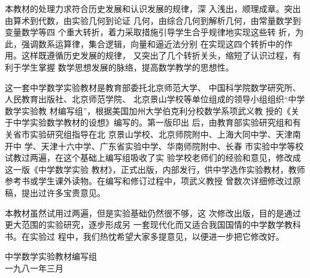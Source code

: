    本教材的处理力求符合历史发展和认识发展的规律，深
入浅出，顺理成章。突出由算术到代数，由实验几何到论证
几何，由综合几何到解析几何，由常量数学到变量数学等四
个重大转折，着力采取措施引导学生合乎规律地实现这些转
折，为此，强调数系运算律，集合逻辑，向量和逼近法分别
在实现这四个转折中的作用。这样既遵循历史发展的规律，
又突出了几个转折关头，缩短了认识过程，有利于学生掌握
数学思想发展的脉络，提高数学教学的思想性。

这一套中学数学实验教材是教育部委托北京师范大学、
中国科学院数学研究所、人民教育出版社、北京师范学院、
北京景山学校等单位组成的领导小组组织“中学数学实验教
材编写组”，根据美国加州大学伯克利分校数学系项武义教
授的《关于中学实验数学教材的设想》编写的。第一版印出
后，由教育部实验研究组和有关省市实验研究组指导在北
京景山学校、北京师院附中、上海大同中学、天津南开中
学、天津十六中学、广东省实验中学、华南师院附中、长春
市实验中学等校试教过两遍，在这个基础上编写组吸收了实
验学校老师们的经验和意见，修改成这一版《中学数学实验
教材》，正式出版，内部发行，供中学选作实验教材，教师
参考书或学生课外读物。在编写和修订过程中，项武义教授
曾数次详细修改过原稿，提出过许多宝贵意见。

    本教材虽然试用过两遍，但是实验基础仍然很不够，这
次修改出版，目的是通过更大范围的实验研究，逐步形成另
一套现代化而又适合我国国情的中学数学教科书。在实验过
程中，我们热忱希望大家多提意见，以便进一步把它修改好。

\begin{flushright}
    中学数学实验教材编写组\\
    一九八一年三月
\end{flushright}








